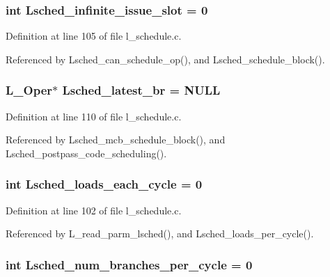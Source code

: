 \subsubsection{\setlength{\rightskip}{0pt plus 5cm}int \bf{Lsched\_\-infinite\_\-issue\_\-slot} = 0}\label{l__schedule_8c_2d920740be5e3d47a1f43c90428182eb}




Definition at line 105 of file l\_\-schedule.c.

Referenced by Lsched\_\-can\_\-schedule\_\-op(), and Lsched\_\-schedule\_\-block().
\subsubsection{\setlength{\rightskip}{0pt plus 5cm}L\_\-Oper$\ast$ \bf{Lsched\_\-latest\_\-br} = \bf{NULL}}\label{l__schedule_8c_9038dbd897cfe1df535858875651b3e4}




Definition at line 110 of file l\_\-schedule.c.

Referenced by Lsched\_\-mcb\_\-schedule\_\-block(), and Lsched\_\-postpass\_\-code\_\-scheduling().
\subsubsection{\setlength{\rightskip}{0pt plus 5cm}int \bf{Lsched\_\-loads\_\-each\_\-cycle} = 0}\label{l__schedule_8c_14f9b657ee8e365347a970ed01a869a1}




Definition at line 102 of file l\_\-schedule.c.

Referenced by L\_\-read\_\-parm\_\-lsched(), and Lsched\_\-loads\_\-per\_\-cycle().
\subsubsection{\setlength{\rightskip}{0pt plus 5cm}int \bf{Lsched\_\-num\_\-branches\_\-per\_\-cycle} = 0}\label{l__schedule_8c_42512cec3f5bb5c7b60f1db41f252ec7}




